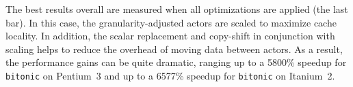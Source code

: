 
The best results overall are measured when all optimizations are
applied (the last bar). In this case, the granularity-adjusted actors
are scaled to maximize cache locality. In addition, the scalar replacement
and copy-shift in conjunction with scaling helps to reduce the overhead of 
moving data between actors. As a result, the performance gains can be quite
dramatic, ranging up to a 5800\% speedup for \texttt{bitonic} on Pentium~3
and up to a 6577\% speedup for \texttt{bitonic} on Itanium~2.



